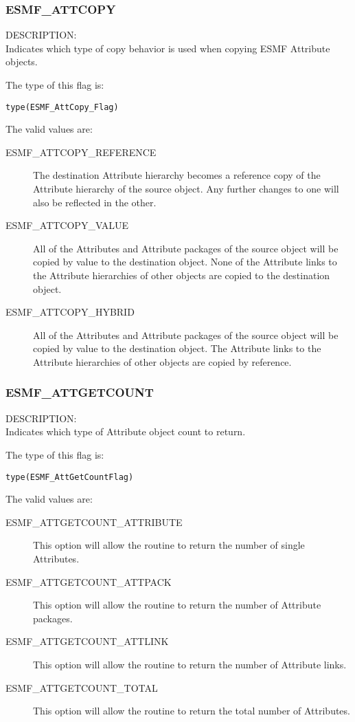 
\subsubsection{ESMF\_ATTCOPY}
\label{const:attcopy}
{\sf DESCRIPTION:\\}
Indicates which type of copy behavior is used when copying ESMF Attribute objects.

The type of this flag is:

{\tt type(ESMF\_AttCopy\_Flag)}

The valid values are:
\begin{description}
  \item[ESMF\_ATTCOPY\_REFERENCE]
    The destination Attribute hierarchy becomes a reference copy of
    the Attribute hierarchy of the source object. Any further changes to one
    will also be reflected in the other.
  \item[ESMF\_ATTCOPY\_VALUE]
    All of the Attributes and Attribute packages of the source object will be
    copied by value to the destination object. None of the Attribute links to
    the Attribute hierarchies of other objects are copied to the
    destination object.
  \item[ESMF\_ATTCOPY\_HYBRID]
    All of the Attributes and Attribute packages of the source object will be
    copied by value to the destination object. The Attribute links to the
    Attribute hierarchies of other objects are copied by reference.
\end{description}

\subsubsection{ESMF\_ATTGETCOUNT}
\label{const:attgetcount}

{\sf DESCRIPTION:\\}
Indicates which type of Attribute object count to return.

The type of this flag is:

{\tt type(ESMF\_AttGetCountFlag)}

The valid values are:
\begin{description}
	\item[ESMF\_ATTGETCOUNT\_ATTRIBUTE]
	This option will allow the routine to return the number of single Attributes.
	\item[ESMF\_ATTGETCOUNT\_ATTPACK]
	This option will allow the routine to return the number of Attribute packages.
	\item[ESMF\_ATTGETCOUNT\_ATTLINK]
	This option will allow the routine to return the number of Attribute links.
	\item[ESMF\_ATTGETCOUNT\_TOTAL]
	This option will allow the routine to return the total number of Attributes.
\end{description}

